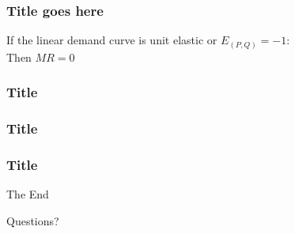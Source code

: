 \documentclass{beamer}
\begin{document}

\begin{frame}
\frametitle{Title goes here}
\begin{theorem}[Title]
\centering
If the linear demand curve is unit elastic or $E_{(P,Q)}= -1$:\\
Then $MR = 0$
\end{theorem}
\end{frame}


\begin{frame}
\frametitle{Title}
\end{frame}



\begin{frame}
\frametitle{Title}
\end{frame}


\begin{frame}
\frametitle{Title}
\end{frame}


\begin{frame}
\Huge{\centerline{The End}}
\end{frame}


\begin{frame}
\Huge{\centerline{Questions?}}
\end{frame}

\end{document}
